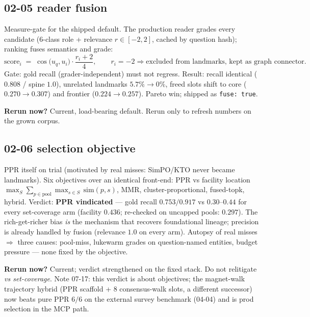 \documentclass[10pt]{article}
\newcommand{\rerun}[1]{\par\smallskip\noindent\textbf{Rerun now?} #1}
\begin{document}
\subsection*{02-05 reader fusion}
Measure-gate for the shipped default. The production reader grades every candidate (6-class
role + relevance $r\in[-2,2]$, cached by question hash); ranking fuses semantics and grade:
\begin{equation}
\mathrm{score}_i \;=\; \cos\!\big(u_q, u_i\big)\cdot \frac{r_i + 2}{4},
\qquad r_i = -2 \Rightarrow \text{excluded from landmarks, kept as graph connector.}
\end{equation}
Gate: gold recall (grader-independent) must not regress. Result: recall identical
($0.808$ / spine $1.0$), unrelated landmarks $5.7\%\to 0\%$, freed slots shift to core
($0.270\to0.307$) and frontier ($0.224\to0.257$). Pareto win; shipped as \texttt{fuse: true}.
\rerun{Current, load-bearing default. Rerun only to refresh numbers on the grown corpus.}

\subsection*{02-06 selection objective}
PPR itself on trial (motivated by real misses: SimPO/KTO never became landmarks). Six
objectives over an identical front-end: PPR vs facility location
$\max_S \sum_{p\in\mathrm{pool}} \max_{s\in S}\, \mathrm{sim}(p,s)$, MMR, cluster-proportional,
fused-topk, hybrid. Verdict: \textbf{PPR vindicated} --- gold recall $0.753/0.917$ vs
$0.30$--$0.44$ for every set-coverage arm (facility $0.436$; re-checked on uncapped pools:
$0.297$). The rich-get-richer bias \emph{is} the mechanism that recovers foundational lineage;
precision is already handled by fusion (relevance $1.0$ on every arm). Autopsy of real misses
$\Rightarrow$ three causes: pool-miss, lukewarm grades on question-named entities, budget
pressure --- none fixed by the objective.
\rerun{Current; verdict strengthened on the fixed stack. Do not relitigate \emph{vs
set-coverage}. Note 07-17: this verdict is about objectives; the magnet-walk trajectory hybrid
(PPR scaffold + 8 consensus-walk slots, a different successor) now beats pure PPR $6/6$ on the
external survey benchmark (04-04) and is prod selection in the MCP path.}
\end{document}
